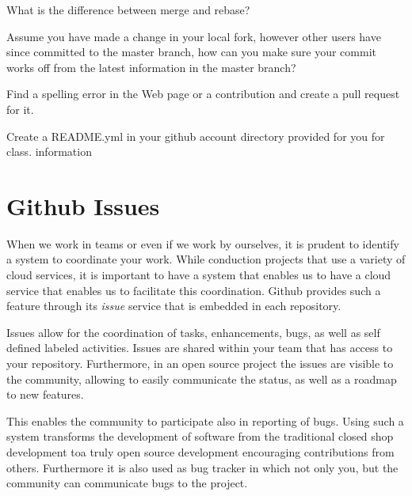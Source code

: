 \begin{exercise}
\label{E:Github.2} What is the difference between merge and rebase?
\end{exercise}

\begin{exercise}
\label{E:Github.3} Assume you have made a change in your local fork,
  however other users have since committed to the master branch, how
  can you make sure your commit works off from the latest information
  in the master branch?
\end{exercise}

\begin{exercise}
\label{E:Github.4} Find a spelling error in the Web page or a
  contribution and create a pull request for it.
\end{exercise}

\begin{exercise}
\label{E:Gitlab.5} Create a README.yml in your github account directory
  provided for you for class.  information
\end{exercise}

\section{Github Issues}\label{S:git-issues}

When we work in teams or even if we work by ourselves, it is prudent to
identify a system to coordinate your work. While conduction projects
that use a variety of cloud services, it is important to have a system
that enables us to have a cloud service that enables us to facilitate
this coordination. Github provides such a feature through its {\em
  issue} service that is embedded in each repository. 


Issues allow for the coordination of tasks, enhancements, bugs, as
well as self defined labeled activities. Issues are shared within your
team that has access to your repository. Furthermore, in an open
source project the issues are visible to the community, allowing to
easily communicate the status, as well as a roadmap to new features. 

This enables the community to participate also in reporting of
bugs. Using such a system transforms the development of software from
the traditional closed shop development toa truly open source
development encouraging contributions from others. Furthermore it is
also used as bug tracker in which not only you, but the community can
communicate bugs to the project.

